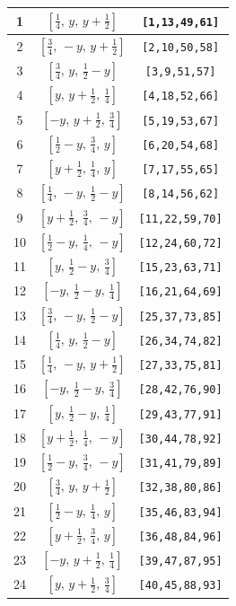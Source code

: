 \documentclass[fleqn,8pt]{jsarticle}
\begin{document}
\begin{longtable}{ccc}
1 & $\left[ \frac{1}{4},\, y,\, y + \frac{1}{2} \right]$ & {\tt [1,13,49,61]} \\ \hline
2 & $\left[ \frac{3}{4},\, - y,\, y + \frac{1}{2} \right]$ & {\tt [2,10,50,58]} \\ \hline
3 & $\left[ \frac{3}{4},\, y,\, \frac{1}{2} - y \right]$ & {\tt [3,9,51,57]} \\ \hline
4 & $\left[ y,\, y + \frac{1}{2},\, \frac{1}{4} \right]$ & {\tt [4,18,52,66]} \\ \hline
5 & $\left[ - y,\, y + \frac{1}{2},\, \frac{3}{4} \right]$ & {\tt [5,19,53,67]} \\ \hline
6 & $\left[ \frac{1}{2} - y,\, \frac{3}{4},\, y \right]$ & {\tt [6,20,54,68]} \\ \hline
7 & $\left[ y + \frac{1}{2},\, \frac{1}{4},\, y \right]$ & {\tt [7,17,55,65]} \\ \hline
8 & $\left[ \frac{1}{4},\, - y,\, \frac{1}{2} - y \right]$ & {\tt [8,14,56,62]} \\ \hline
9 & $\left[ y + \frac{1}{2},\, \frac{3}{4},\, - y \right]$ & {\tt [11,22,59,70]} \\ \hline
10 & $\left[ \frac{1}{2} - y,\, \frac{1}{4},\, - y \right]$ & {\tt [12,24,60,72]} \\ \hline
11 & $\left[ y,\, \frac{1}{2} - y,\, \frac{3}{4} \right]$ & {\tt [15,23,63,71]} \\ \hline
12 & $\left[ - y,\, \frac{1}{2} - y,\, \frac{1}{4} \right]$ & {\tt [16,21,64,69]} \\ \hline
13 & $\left[ \frac{3}{4},\, - y,\, \frac{1}{2} - y \right]$ & {\tt [25,37,73,85]} \\ \hline
14 & $\left[ \frac{1}{4},\, y,\, \frac{1}{2} - y \right]$ & {\tt [26,34,74,82]} \\ \hline
15 & $\left[ \frac{1}{4},\, - y,\, y + \frac{1}{2} \right]$ & {\tt [27,33,75,81]} \\ \hline
16 & $\left[ - y,\, \frac{1}{2} - y,\, \frac{3}{4} \right]$ & {\tt [28,42,76,90]} \\ \hline
17 & $\left[ y,\, \frac{1}{2} - y,\, \frac{1}{4} \right]$ & {\tt [29,43,77,91]} \\ \hline
18 & $\left[ y + \frac{1}{2},\, \frac{1}{4},\, - y \right]$ & {\tt [30,44,78,92]} \\ \hline
19 & $\left[ \frac{1}{2} - y,\, \frac{3}{4},\, - y \right]$ & {\tt [31,41,79,89]} \\ \hline
20 & $\left[ \frac{3}{4},\, y,\, y + \frac{1}{2} \right]$ & {\tt [32,38,80,86]} \\ \hline
21 & $\left[ \frac{1}{2} - y,\, \frac{1}{4},\, y \right]$ & {\tt [35,46,83,94]} \\ \hline
22 & $\left[ y + \frac{1}{2},\, \frac{3}{4},\, y \right]$ & {\tt [36,48,84,96]} \\ \hline
23 & $\left[ - y,\, y + \frac{1}{2},\, \frac{1}{4} \right]$ & {\tt [39,47,87,95]} \\ \hline
24 & $\left[ y,\, y + \frac{1}{2},\, \frac{3}{4} \right]$ & {\tt [40,45,88,93]} \\
\end{longtable}
\end{document}
